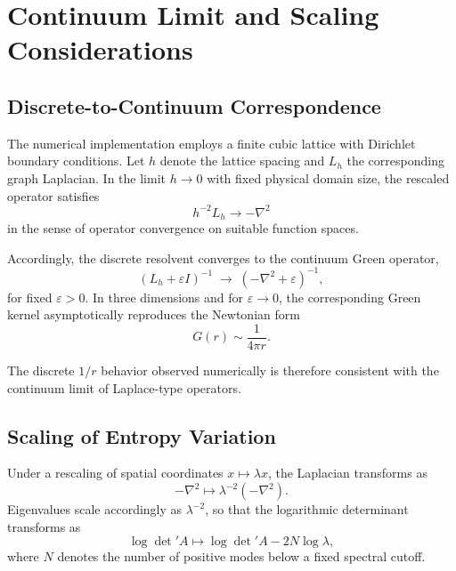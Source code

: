 \section{Continuum Limit and Scaling Considerations}
  \label{sec:continuum-limit-and-scaling-considerations}

  \subsection{Discrete-to-Continuum Correspondence}
    \label{subsec:discrete-to-continuum-correspondence}

    The numerical implementation employs a finite cubic lattice with
    Dirichlet boundary conditions.
    Let $h$ denote the lattice spacing and $L_h$ the corresponding
    graph Laplacian.
    In the limit $h \to 0$ with fixed physical domain size,
    the rescaled operator satisfies
    \begin{equation}
      h^{-2} L_h \longrightarrow -\nabla^2
    \end{equation}
    in the sense of operator convergence on suitable function spaces.

    Accordingly, the discrete resolvent converges to the continuum Green operator,
    \begin{equation}
      (L_h + \varepsilon I)^{-1}
      \;\longrightarrow\;
      (-\nabla^2 + \varepsilon)^{-1},
    \end{equation}
    for fixed $\varepsilon > 0$.
    In three dimensions and for $\varepsilon \to 0$,
    the corresponding Green kernel asymptotically reproduces
    the Newtonian form
    \begin{equation}
      G(r) \sim \frac{1}{4\pi r}.
    \end{equation}

    The discrete $1/r$ behavior observed numerically is therefore
    consistent with the continuum limit of Laplace-type operators.

  \subsection{Scaling of Entropy Variation}

    Under a rescaling of spatial coordinates
    $x \mapsto \lambda x$,
    the Laplacian transforms as
    \begin{equation}
      -\nabla^2 \mapsto \lambda^{-2} (-\nabla^2).
    \end{equation}
    Eigenvalues scale accordingly as $\lambda^{-2}$,
    so that the logarithmic determinant transforms as
    \begin{equation}
      \log \det{}' A \mapsto
      \log \det{}' A - 2 N \log \lambda,
    \end{equation}
    where $N$ denotes the number of positive modes
    below a fixed spectral cutoff.

